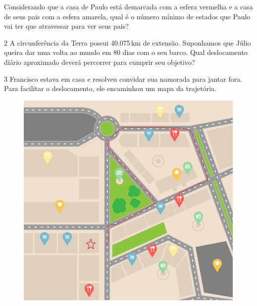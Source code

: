 
Considerando que a casa de Paulo está demarcada com a esfera vermelha e
a casa de seus pais com a esfera amarela, qual é o número mínimo de
estados que Paulo vai ter que atravessar para ver seus pais?



\num{2} A circunferência da Terra possui 40.075\,km de extensão. Suponhamos
que Júlio queira dar uma volta ao mundo em 80 dias com o seu barco. Qual
deslocamento diário aproximado deverá percorrer para cumprir seu
objetivo?


\num{3} Francisco estava em casa e resolveu convidar sua namorada para jantar
fora. Para facilitar o deslocamento, ele encaminhou um mapa da
trajetória.



\begin{figure}[H]
\centering\includegraphics[width=\textwidth]{./imgSAEB_8_MAT/media/image37.png}
\end{figure}

